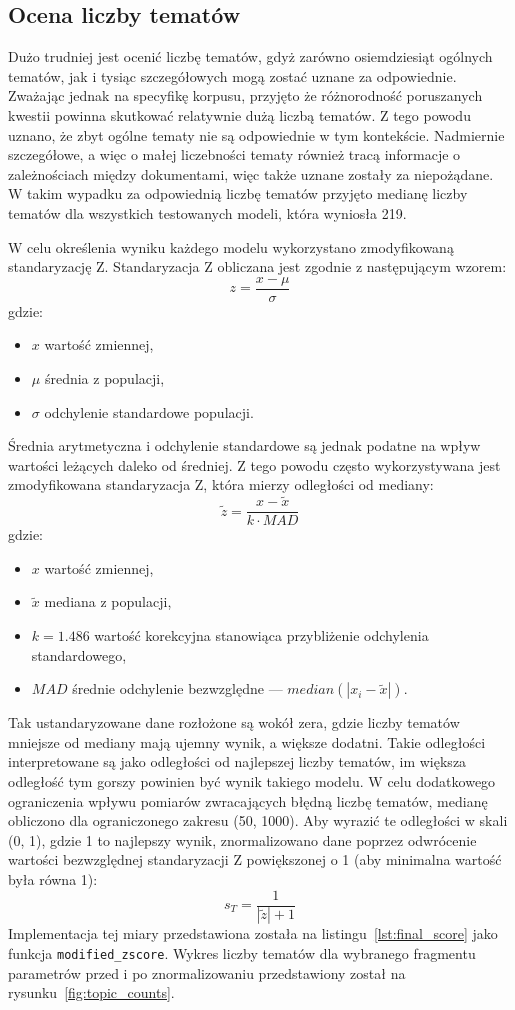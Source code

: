 	\subsection{Ocena liczby tematów}\label{sec:score_topic_count}
		Dużo trudniej jest ocenić liczbę tematów, gdyż zarówno osiemdziesiąt ogólnych tematów,
			jak i tysiąc szczegółowych mogą zostać uznane za odpowiednie.
		Zważając jednak na specyfikę korpusu, przyjęto że różnorodność poruszanych kwestii powinna skutkować relatywnie dużą liczbą tematów.
		Z tego powodu uznano, że zbyt ogólne tematy nie są odpowiednie w tym kontekście.
		Nadmiernie szczegółowe, a więc o małej liczebności tematy również tracą informacje o zależnościach między dokumentami,
			więc także uznane zostały za niepożądane.
		W takim wypadku za odpowiednią liczbę tematów przyjęto medianę liczby tematów dla wszystkich testowanych modeli, która wyniosła 219.

		W celu określenia wyniku każdego modelu wykorzystano zmodyfikowaną standaryzację Z.
		Standaryzacja Z obliczana jest zgodnie z następującym wzorem:
		\[z=\frac{x-\mu}{\sigma}\]
		gdzie:
		\begin{itemize}
			\item \(x\) wartość zmiennej,
			\item \(\mu\) średnia z populacji,
			\item \(\sigma\) odchylenie standardowe populacji.
		\end{itemize}
		
		Średnia arytmetyczna i odchylenie standardowe są jednak podatne na wpływ wartości leżących daleko od średniej.
		Z tego powodu często wykorzystywana jest zmodyfikowana standaryzacja Z, która mierzy odległości od mediany:
		\[\tilde{z}=\frac{x-\tilde{x}}{k\cdot MAD}\]
		gdzie:
		\begin{itemize}
			\item \(x\) wartość zmiennej,
			\item \(\tilde{x}\) mediana z populacji,
			\item \(k=1.486\) wartość korekcyjna stanowiąca przybliżenie odchylenia standardowego,
			\item \(MAD\) średnie odchylenie bezwzględne --- \(median\left(|x_i-\tilde{x}|\right)\).
		\end{itemize}

		Tak ustandaryzowane dane rozłożone są wokół zera, gdzie liczby tematów mniejsze od mediany mają ujemny wynik, a większe dodatni.
		Takie odległości interpretowane są jako odległości od najlepszej liczby tematów,
			im większa odległość tym gorszy powinien być wynik takiego modelu.
		W celu dodatkowego ograniczenia wpływu pomiarów zwracających błędną liczbę tematów, medianę obliczono dla ograniczonego zakresu (50, 1000).
		Aby wyrazić te odległości w skali (0, 1), gdzie 1 to najlepszy wynik, znormalizowano dane
			poprzez odwrócenie wartości bezwzględnej standaryzacji Z powiększonej o 1 (aby minimalna wartość była równa 1):
		\[s_T=\frac{1}{|\tilde{z}|+1}\]
		Implementacja tej miary przedstawiona została na listingu~\ref{lst:final_score} jako funkcja \verb|modified_zscore|.
		Wykres liczby tematów dla wybranego fragmentu parametrów przed i po znormalizowaniu przedstawiony został na rysunku~\ref{fig:topic_counts}.

